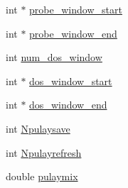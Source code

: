 \begin{DoxyCompactItemize}
\item 
int $\ast$ \hyperlink{structcomplex__energy__integral_aed1bde009aa6ebcc1894c473b91f6054}{probe\-\_\-window\-\_\-start}
\item 
int $\ast$ \hyperlink{structcomplex__energy__integral_af18c3646334b84ce3643eb27c94af1f3}{probe\-\_\-window\-\_\-end}
\item 
int \hyperlink{structcomplex__energy__integral_a0ae298eee5e87583adb8b3fc8b235c99}{num\-\_\-dos\-\_\-window}
\item 
int $\ast$ \hyperlink{structcomplex__energy__integral_aefbc0519b80e3893aef5aaf20282948e}{dos\-\_\-window\-\_\-start}
\item 
int $\ast$ \hyperlink{structcomplex__energy__integral_ac696dfda6ef7a47f93b8be3049e64f43}{dos\-\_\-window\-\_\-end}
\item 
int \hyperlink{structcomplex__energy__integral_a08458d2830891ae8fd31d05354d96bae}{Npulaysave}
\item 
int \hyperlink{structcomplex__energy__integral_aa2437631a6a03e5a30ec1e8717248079}{Npulayrefresh}
\item 
double \hyperlink{structcomplex__energy__integral_a311a80abee109c317375a3ee75824cac}{pulaymix}
\end{DoxyCompactItemize}


